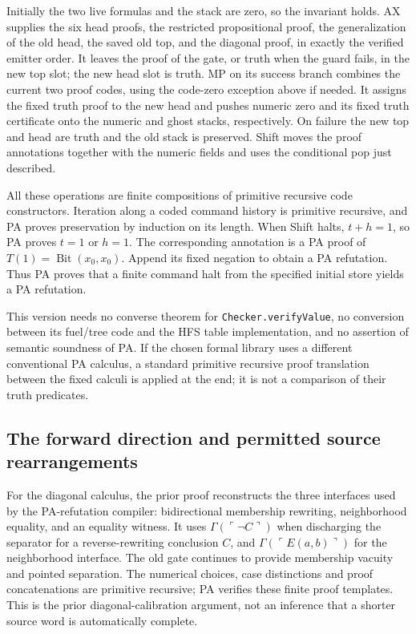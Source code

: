 Initially the two live formulas and the stack are zero, so the invariant
holds.  AX supplies the six head proofs, the restricted propositional
proof, the generalization of the old head, the saved old top, and the
diagonal proof, in exactly the verified emitter order.  It leaves the
proof of the gate, or truth when the guard fails, in the new top slot;
the new head slot is truth.  MP on its success branch combines the
current two proof codes, using the code-zero exception above if needed.
It assigns the fixed truth proof to the new head and pushes numeric zero
and its fixed truth certificate onto the numeric and ghost stacks,
respectively.  On failure the new top and head are truth and the old
stack is preserved.  Shift moves the proof annotations together with
the numeric fields and uses the conditional pop just described.

All these operations are finite compositions of primitive recursive
code constructors.  Iteration along a coded command history is primitive
recursive, and PA proves preservation by induction on its length.
When Shift halts, $t+h=1$, so PA proves $t=1$ or $h=1$.
The corresponding annotation is a PA proof of
$T(1)=\operatorname{Bit}(x_0,x_0)$.  Append its fixed negation to obtain
a PA refutation.  Thus PA proves that a finite command halt from the
specified initial store yields a PA refutation.

This version needs no converse theorem for
\texttt{Checker.verifyValue}, no conversion between its fuel/tree code
and the HFS table implementation, and no assertion of semantic
soundness of PA.  If the chosen formal library uses a different
conventional PA calculus, a standard primitive recursive proof
translation between the fixed calculi is applied at the end; it is not
a comparison of their truth predicates.

\subsection{The forward direction and permitted source rearrangements}

For the diagonal calculus, the prior proof reconstructs the three
interfaces used by the PA-refutation compiler: bidirectional membership
rewriting, neighborhood equality, and an equality witness.  It uses
$\Gamma(\ulcorner\neg C\urcorner)$ when discharging the separator
for a reverse-rewriting conclusion $C$, and
$\Gamma(\ulcorner E(a,b)\urcorner)$ for the neighborhood interface.
The old gate continues to provide membership vacuity and pointed
separation.  The numerical choices, case distinctions and proof
concatenations are primitive recursive; PA verifies these finite
proof templates.  This is the prior diagonal-calibration argument,
not an inference that a shorter source word is automatically complete.

